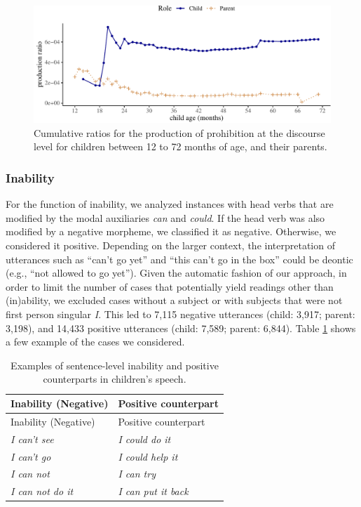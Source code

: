 \documentclass[
  english,
  man,floatsintext]{apa6}
\begin{document}
\begin{figure}[H]

{\centering \includegraphics{neg_construction_article_files/figure-latex/prohibitiondiscourse-1} 

}

\caption{Cumulative ratios for the production of prohibition at the discourse level for children between 12 to 72 months of age, and their parents.}\label{fig:prohibitiondiscourse}
\end{figure}

\hypertarget{inability}{%
\subsubsection{Inability}\label{inability}}

For the function of inability, we analyzed instances with head verbs that are modified by the modal auxiliaries \emph{can} and \emph{could}. If the head verb was also modified by a negative morpheme, we classified it as negative. Otherwise, we considered it positive. Depending on the larger context, the interpretation of utterances such as ``can't go yet'' and ``this can't go in the box'' could be deontic (e.g., ``not allowed to go yet''). Given the automatic fashion of our approach, in order to limit the number of cases that potentially yield readings other than (in)ability, we excluded cases without a subject or with subjects that were not first person singular \emph{I}. This led to 7,115 negative utterances (child: 3,917; parent: 3,198), and 14,433 positive utterances (child: 7,589; parent: 6,844). Table \ref{tab:inab} shows a few example of the cases we considered.

\begin{longtable}[]{@{}ll@{}}
\caption{\label{tab:inab} Examples of sentence-level inability and positive counterparts in children's speech.}\tabularnewline
\toprule
Inability (Negative) & Positive counterpart \\
\midrule
\endfirsthead
\toprule
Inability (Negative) & Positive counterpart \\
\midrule
\endhead
\emph{I can't see} & \emph{I could do it} \\
\emph{I can't go} & \emph{I could help it} \\
\emph{I can not} & \emph{I can try} \\
\emph{I can not do it} & \emph{I can put it back} \\
\bottomrule
\end{longtable}
\end{document}
